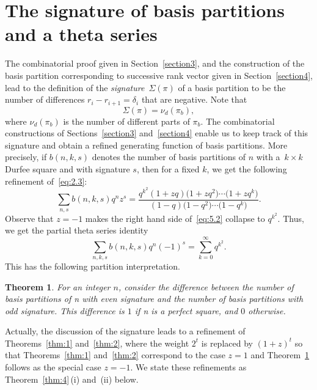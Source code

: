\documentclass[10pt,a4paper]{amsart}
\numberwithin{equation}{section}
\newtheorem{Theorem}{Theorem}[section]
\theoremstyle{definition}
\begin{document}
\section{The signature of basis partitions and a theta series}\label{section5}

The combinatorial proof given in Section~\ref{section3}, and the construction of
the basis partition corresponding to successive rank vector given in
Section~\ref{section4}, lead to the definition of the {\it signature}~$\Sigma(\pi)$
of a basis partition to be the number of differences $r_i-r_{i+1}=\delta_i$
that are negative. Note that
\begin{equation*}
\Sigma (\pi)=\nu_d(\pi_b),%
\end{equation*}
where $\nu_d(\pi_b)$ is the number of different parts of $\pi_b$. The
combinatorial constructions of Sections~\ref{section3} and~\ref{section4} enable us to keep track
of this signature and obtain a refined generating function of basis
partitions. More precisely, if $b(n,k,s)$ denotes the number of basis
partitions of $n$ with a~${k\times k}$ Durfee square and with signature
$s$, then for a fixed $k$, we get the following refinement of~\eqref{eq:2.3}:
\begin{equation}
\sum_{n,s}b(n,k,s)q^nz^s=\frac{q^{k^2}(1+zq)\bigl(1+zq^2\bigr)\cdots \bigl(1+zq^k\bigr)}
{(1-q)\bigl(1-q^2\bigr)\cdots \bigl(1-q^k\bigr)}.\label{eq:5.2}
\end{equation}
Observe that $z=-1$ makes the right hand side of~\eqref{eq:5.2} collapse to
$q^{k^2}$. Thus, we get the partial theta series identity
\begin{equation*}
\sum_{n,k,s}b(n,k,s)q^n(-1)^s=\sum^{\infty}_{k=0}q^{k^2}.%
\end{equation*}
This has the following partition interpretation.


\begin{Theorem}\label{thm:3}
For an integer $n$, consider the difference between
the number of basis partitions of n with even signature and the number of
basis partitions with odd signature. This difference is $1$ if n is
a perfect square, and $0$ otherwise.
\end{Theorem}


Actually, the discussion of the signature leads to a refinement of
Theorems~\ref{thm:1} and~\ref{thm:2}, where the weight $2^t$ is replaced by $(1+z)^t$ so
that Theorems~\ref{thm:1} and~\ref{thm:2} correspond to the case $z=1$ and Theorem~\ref{thm:3}
follows as the special case $z=-1$. We state these refinements as
Theorem~\ref{thm:4}\,(i) and~(ii) below.
\end{document}
